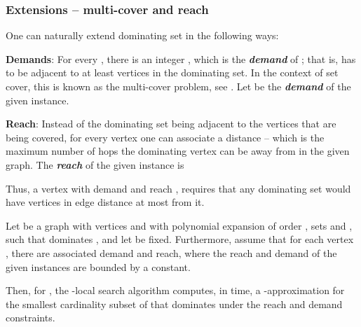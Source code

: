 \documentclass[12pt]{article}
\newcommand{\emphic}[2]{\textcolor{blue25}{\textbf{\emph{#1}}}\index{#2}}
\renewcommand{\emphic}[2]{\textbf{\emph{#1}}}
\newcommand{\emphi}[1]{\emphic{#1}{#1}}
\theoremstyle{remark}\theoremheaderfont{\sf}\theorembodyfont{\upshape}
\numberwithin{figure}{section}\numberwithin{table}{section}\numberwithin{equation}{section}
\newcommand{\lemlab}[1]{\label{lemma:#1}}
\begin{document}
\subsubsection{Extensions -- multi-cover and reach}


One can naturally extend dominating set in the following ways:
\smallskip \begin{compactenum}[(A)]
\item \textbf{Demands}: For every , there is an integer
  , which is the \emphi{demand} of ; that is,
   has to be adjacent to at least  vertices in the
  dominating set. In the context of set cover, this is known as the
  multi-cover problem, see \cite{cch-smcpg-12}. Let
   be the
  \emphi{demand} of the given instance.

\item \textbf{Reach}: Instead of the dominating set being adjacent to
  the vertices that are being covered, for every vertex
   one can associate a distance  --
  which is the maximum number of hops the dominating vertex can be
  away from  in the given graph. The \emphi{reach} of the given
  instance is
  
\end{compactenum}
\smallskip Thus, a vertex  with demand  and reach ,
requires that any dominating set would have  vertices in
edge distance at most  from it.

\begin{lemma} \lemlab{ptas:subset:dom:2} Let  be a graph with  vertices and with polynomial
  expansion of order , sets  and
  , such that  dominates
  , and let  be fixed. Furthermore, assume that for
  each vertex , there are associated demand and reach,
  where the reach  and demand  of the given
  instances are bounded by a constant.

  Then, for , the
  -local search algorithm computes, in 
  time, a -approximation for the smallest cardinality
  subset of  that dominates  under the reach and
  demand constraints.
\end{lemma}
\end{document}
